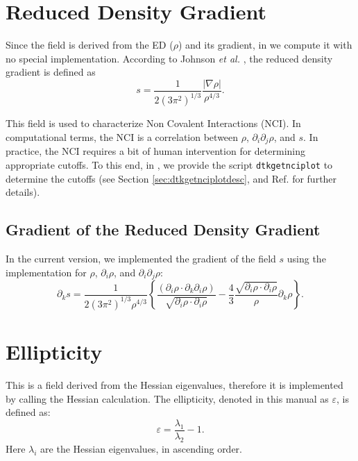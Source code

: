 \section{Reduced Density Gradient}
Since the field is derived from the ED ($\rho$) and its gradient, in \DTK{} we
compute it with no special implementation. According to Johnson \textit{et al.} \cite{bib:johnson2010}, the
reduced density gradient is defined as
%
\begin{equation}%
  s=\frac{1}{2(3\pi^2)^{1/3}}\frac{|\nabla\rho|}{\rho^{4/3}}.
\end{equation}
%

This field is used to characterize Non Covalent Interactions (NCI). In computational terms, the
NCI is a correlation between $\rho$, $\partial_i\partial_j\rho$, and $s$. In practice,
the NCI requires a bit of human intervention for determining appropriate cutoffs.
To this end, in \DTK, we provide the script \texttt{dtkgetnciplot} to determine
the cutoffs (see Section \ref{sec:dtkgetnciplotdesc}, and Ref. \cite{bib:contreras2011}
for further details).
\subsection{Gradient of the Reduced Density Gradient}
In the current version, we implemented the gradient of the field $s$ using the implementation
for $\rho$, $\partial_i\rho$, and $\partial_i\partial_j\rho$:
\begin{equation}
	\partial_ks=\frac{1}{2(3\pi^2)^{1/3}\rho^{4/3}}\left\{
		\frac{\left(\partial_i\rho\cdot\partial_k\partial_i\rho\right)}{\sqrt{\partial_i\rho\cdot\partial_i\rho}}
		-\frac{4}{3}\frac{\sqrt{\partial_i\rho\cdot\partial_i\rho}}{\rho}\partial_k\rho
	\right\}.
\end{equation}

\section{Ellipticity}
This is a field derived from the Hessian eigenvalues, therefore it is implemented
by calling the Hessian calculation. The ellipticity, denoted in this manual as
$\varepsilon$, is defined as:
\begin{equation}
   \varepsilon=\frac{\lambda_1}{\lambda_2}-1.
\end{equation}
Here $\lambda_i$ are the Hessian eigenvalues, in ascending order.

